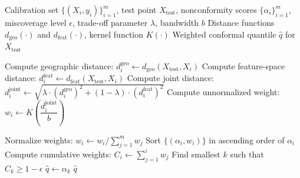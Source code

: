 \documentclass[authoryear,preprint,review,12pt]{elsarticle}
\begin{document}
\begin{algorithm}[ht]
\caption{GeoSIMCP: Jointly Weighted Conformal Prediction}
\label{alg:geosimcp}
\begin{algorithmic}[1]
\Require Calibration set $\{(X_i, y_i)\}_{i=1}^m$, test point $X_{\text{test}}$, nonconformity scores $\{\alpha_i\}_{i=1}^m$, miscoverage level $\epsilon$, trade-off parameter $\lambda$, bandwidth $b$
\Require Distance functions $d_{\text{geo}}(\cdot)$ and $d_{\text{feat}}(\cdot)$, kernel function $K(\cdot)$
\Ensure Weighted conformal quantile $\hat{q}$ for $X_{\text{test}}$

    \State Compute geographic distance: $d_i^{\text{geo}} \gets d_{\text{geo}}(X_{\text{test}}, X_i)$
    \State Compute feature-space distance: $d_i^{\text{feat}} \gets d_{\text{feat}}(X_{\text{test}}, X_i)$
    \State Compute joint distance: $d_i^{\text{joint}} \gets \sqrt{\lambda \cdot (d_i^{\text{geo}})^2 + (1 - \lambda) \cdot (d_i^{\text{feat}})^2}$
    \State Compute unnormalized weight: $w_i \gets K\left( \dfrac{d_i^{\text{joint}}}{b} \right)$
\EndFor

\State Normalize weights: $w_i \gets w_i / \sum_{j=1}^m w_j$
\State Sort $\{(\alpha_i, w_i)\}$ in ascending order of $\alpha_i$
\State Compute cumulative weights: $C_i \gets \sum_{j=1}^i w_j$
\State Find smallest $k$ such that $C_k \geq 1 - \epsilon$
\State $\hat{q} \gets \alpha_k$
\State \Return $\hat{q}$
\end{algorithmic}
\end{algorithm}







\end{document}

